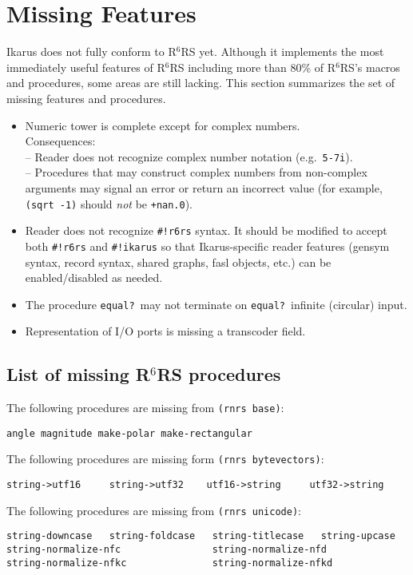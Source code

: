 \documentclass[onecolumn, 12pt, twoside, openright, dvipdfm]{book}
\newcommand{\rnrs}[1]{R$^{\mathrm{#1}}$RS}
\begin{document}
\chapter{Missing Features}

Ikarus does not fully conform to \rnrs{6} yet.  Although it
implements the most immediately useful features of \rnrs{6}
including more than 80\% of \rnrs{6}'s macros and procedures, some
areas are still lacking.  This section summarizes the set of
missing features and procedures.  


\begin{itemize}
\item Numeric tower is complete except for complex numbers.\\
  Consequences: \\
  -- Reader does not recognize complex number notation
    (e.g.~\texttt{5-7i}).\\
  -- Procedures that may construct complex numbers from non-complex
    arguments may signal an error or return an incorrect value
    (for example, \texttt{(sqrt -1)} should \emph{not} be \texttt{+nan.0}).
\item Reader does not recognize \texttt{\#!r6rs} syntax.  It should
be modified to accept both \texttt{\#!r6rs} and \texttt{\#!ikarus}
so that Ikarus-specific reader features (gensym syntax, record
syntax, shared graphs, fasl objects, etc.) can be enabled/disabled as needed.
\item The procedure \texttt{equal?}\ may not terminate on
\texttt{equal?}\ infinite (circular) input.
\item Representation of I/O ports is missing a transcoder field.
\end{itemize}
\newpage
\section{List of missing \rnrs{6} procedures}

The following procedures are missing from \texttt{(rnrs base)}:
\begin{Verbatim}
angle magnitude make-polar make-rectangular
\end{Verbatim}

The following procedures are missing form \texttt{(rnrs bytevectors)}:
\begin{Verbatim}
string->utf16     string->utf32    utf16->string     utf32->string
\end{Verbatim}


The following procedures are missing from \texttt{(rnrs unicode)}:
\begin{Verbatim}
string-downcase   string-foldcase   string-titlecase   string-upcase    
string-normalize-nfc                string-normalize-nfd 
string-normalize-nfkc               string-normalize-nfkd   
\end{Verbatim}
\end{document}
